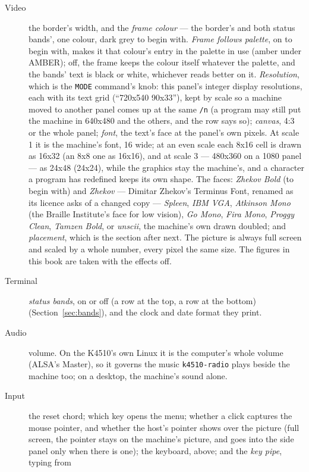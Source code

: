 \begin{description}
\item[Video] the border's width, and the \emph{frame colour} --- the
  border's and both status bands', one colour, dark grey to begin with.
  \emph{Frame follows palette}, on to begin with, makes it that colour's
  entry in the palette in use (amber under AMBER); off, the frame keeps
  the colour itself whatever the palette, and the bands' text is black or
  white, whichever reads better on it. \emph{Resolution}, which is the
  \verb|MODE| command's knob: this panel's integer display resolutions,
  each with its text grid (``720x540 90x33''), kept by scale so a machine
  moved to another panel comes up at the same \verb|/n| (a program may
  still put the machine in 640x480 and the others, and the row says so);
  \emph{canvas}, 4:3 or the whole panel; \emph{font}, the text's face at
  the panel's own pixels. At scale 1 it is the machine's font, 16 wide;
  at an even scale each 8x16 cell is drawn as 16x32 (an 8x8 one as 16x16),
  and at scale 3 --- 480x360 on a 1080 panel --- as 24x48 (24x24),
  while the graphics stay the machine's, and a character a program has
  redefined keeps its own shape. The faces: \emph{Zhekov Bold} (to
  begin with) and \emph{Zhekov} --- Dimitar Zhekov's Terminus Font,
  renamed as its licence asks of a changed copy --- \emph{Spleen},
  \emph{IBM VGA}, \emph{Atkinson Mono} (the Braille Institute's face for
  low vision), \emph{Go Mono}, \emph{Fira Mono}, \emph{Proggy Clean},
  \emph{Tamzen Bold}, or \emph{unscii}, the machine's own drawn doubled;
  and \emph{placement}, which is the section after next. The picture is always full screen and scaled by a whole
  number, every pixel the same size. The figures in this book are taken
  with the effects off.
\item[Terminal] \emph{status bands}, on or off (a row at the top, a row at the bottom)
  (Section~\ref{sec:bands}), and the clock and date format they print.
\item[Audio] volume. On the K4510's own Linux it is the computer's whole volume (ALSA's Master), so it governs the music \verb|k4510-radio| plays beside the machine too; on a desktop, the machine's sound alone.
\item[Input] the reset chord; which key opens the menu; whether a click
  captures the mouse pointer, and whether the host's pointer shows over
  the picture (full screen, the pointer stays on the machine's picture,
  and goes into the side panel only when there is one); the keyboard, above; and the \emph{key pipe}, typing from

\end{description}
